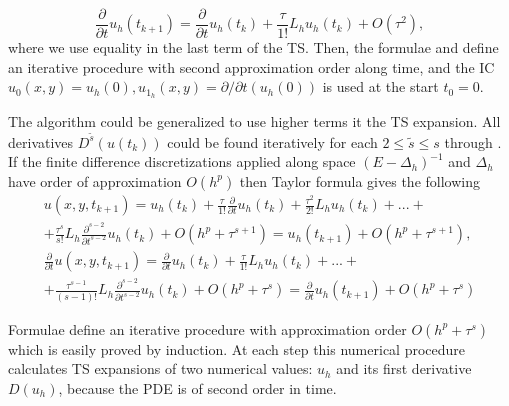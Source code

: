 \documentclass[11pt,a4paper,twoside]{article}
\begin{document}
\begin{equation}\label{taylor22}
\frac{ \partial } { \partial t } u_h( t_{k+1} ) = \frac{\partial } { \partial t }u_h(t_k) + \frac{\tau } {1!} L_h u_h(t_k) + O(\tau^2),
\end{equation}
where we use equality  in the last term of the TS. Then, the formulae  and  define an iterative procedure with second approximation order along time, and the IC $u_0(x,y) = u_h(0), u_{1_h}(x,y) = \partial / \partial t (u_h(0))$ is used at the start $t_0 = 0$.

The algorithm could be generalized to use higher terms it the TS expansion. All derivatives $D^{\tilde s}(u(t_k))$ could be found iteratively for each $2 \leq \tilde s \leq s$ through . If the finite difference discretizations applied along space $(E - \Delta_h)^{-1}$ and $\Delta_h$ have order of approximation $O(h^p)$ then Taylor formula gives the following
\begin{align} \label{GeneralIt}
u(x,y,t_{k+1}) = u_h(t_k) + \frac{\tau } {1!}  \frac{\partial}{\partial t} u_h(t_k) + \frac{ \tau^2} { 2!}L_h u_h(t_k) +... + \nonumber
\\ + \frac{\tau^s}{ s! }L_h \frac{\partial^{s-2}}{\partial t^{s-2}} u_h(t_k) + O(h^p + \tau^{s+1}) = u_h(t_{k+1}) + O(h^p + \tau^{s+1}), \nonumber
\\  \frac{\partial}{\partial t}u(x,y,t_{k+1}) = \frac{\partial}{\partial t} u_h(t_k) + \frac{\tau } {1!}  L_h u_h(t_k) + ... + \nonumber
\\ + \frac{\tau^{s-1}}{ (s-1)! } L_h \frac{\partial^{s-2} }{\partial t^{s-2}} u_h(t_k)  + O(h^p + \tau^s) = \frac{\partial}{\partial t}u_h(t_{k+1}) + O(h^p + \tau^s)
\end{align}

Formulae  define an iterative procedure with approximation order $O(h^p + \tau^s)$ which is easily proved by induction. At each step this numerical procedure calculates TS expansions of two numerical values: $u_h$ and its first derivative $D(u_h)$, because the PDE is of second order in time. 

\end{document}
